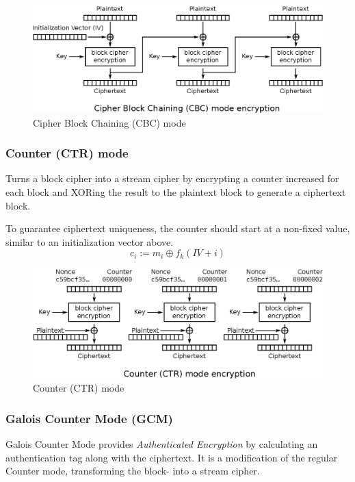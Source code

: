 \documentclass[a4paper]{scrartcl}
\begin{document}
\begin{figure}
    \centering
    \includegraphics[scale=0.7]{images/cbc.eps}
    \caption{Cipher Block Chaining (CBC) mode}
\end{figure}

\subsubsection{Counter (CTR) mode}

Turns a block cipher into a stream cipher by encrypting a counter increased
for each block and XORing the result to the plaintext block to generate a
ciphertext block.

To guarantee ciphertext uniqueness, the counter should start at a non-fixed
value, similar to an initialization vector above.
\[c_i:=m_i\oplus f_k(\mathit{IV}+i)\]

\begin{figure}
    \centering
    \includegraphics[scale=0.7]{images/ctr.eps}
    \caption{Counter (CTR) mode}
\end{figure}

\subsubsection{Galois Counter Mode (GCM)}

Galois Counter Mode provides \textit{Authenticated Encryption} by calculating an
authentication tag along with the ciphertext.  
It is a modification of the regular Counter mode, transforming the block- into
a stream cipher. 
\end{document}

